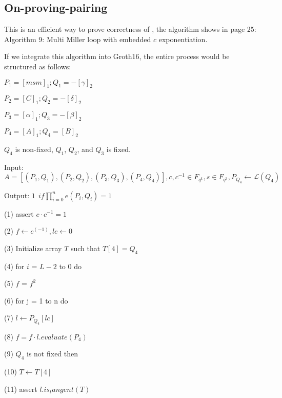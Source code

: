 \subsection{On-proving-pairing}

This is an efficient way to prove correctness of \cite{website:On-proving-pairing}, the algorithm shows in page 25: Algorithm 9: Multi Miller loop with embedded $c$ exponentiation. 

If we integrate this algorithm into Groth16, the entire process would be structured as follows:	\newline

 $\displaystyle P_1 = [msm]_1; Q_1 = -[\gamma]_2 $ \newline

 $\displaystyle P_2 = [C]_1; Q_2 = -[\delta]_2 $

 $\displaystyle P_3 = [\alpha]_1; Q_3 = -[\beta]_2 $

 $\displaystyle P_4 = [A]_1; Q_4 = [B]_2 $


$Q_4$ is non-fixed, $Q_1$, $Q_2$, and $Q_3$ is fixed. \newline


Input: $\displaystyle A = [(P_1,Q_1), (P_2,Q_2), (P_3,Q_3),(P_4,Q_4)],c, c^{-1} \in F_{q^k},s \in F_{q^3},P_{Q_4} \leftarrow \mathcal{L}(Q_4)$ \newline

Output: $\displaystyle 1 \ \ if \prod_{i=0}^{n}e(P_i, Q_i) = 1 $  \newline

(1) assert $\displaystyle c \cdot c^{-1} = 1 $ 

(2) $\displaystyle f \leftarrow c^(-1), lc \leftarrow 0 $ 

(3) Initialize array $T$ such that $\displaystyle T[4] = Q_4 $

(4) for $i$ = $L-2$ to $0$ do 

(5) \indent $f$ = $f^2$ 

(6) \indent for j = 1 to n do 

(7) \indent \indent $\displaystyle l \leftarrow P_{Q_4}[lc] $ 

(8) \indent \indent $\displaystyle f = f \cdot l.evaluate(P_4) $  

(9) \indent \indent $Q_4$ is not fixed then 

(10) \indent \indent \indent $\displaystyle T \leftarrow T[4] $ 

(11) \indent \indent \indent assert $\displaystyle l.is_tangent(T) $ 

